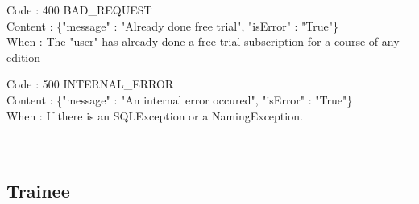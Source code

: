 \begin{itemize}
	Code : 400 BAD\_REQUEST\\
	Content : \{"message" : "Already done free trial", "isError" : "True"\}\\
	When : The "user" has already done a free trial subscription for a course of any edition
	    
    Code : 500 INTERNAL\_ERROR\\
    Content : \{"message" : "An internal error occured", "isError" : "True"\}\\
    When : If there is an SQLException or a NamingException.\\
    ------------------------------------------------------------------------------------------------------------------------------------
\end{itemize}

\subsection*{Trainee}

